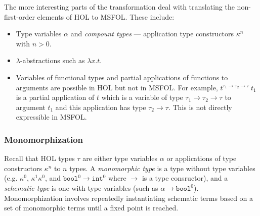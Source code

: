 \documentclass{article}
\begin{document}
	The more interesting parts of the 
	transformation deal with 
	translating the non-first-order
	elements of HOL to MSFOL. These 
	include:
	\begin{itemize}
		\item Type variables $\alpha$
		and \textit{compount types} ---
		application type constructors
		$\kappa^n$ with $n > 0$.
		\item $\lambda$-abstractions 
		such as $\lambda x. t$.
		\item Variables of functional 
		types and partial applications 
		of functions to arguments are 
		possible in HOL but not in 
		MSFOL. For example, 
		$t^{\tau_1 \to \tau_2 \to 
		\tau}\ t_1$ is a 
		partial application of $t$ 
		which is a variable of type 
		$\tau_1 \to \tau_2 \to \tau$
		to argument $t_1$ and this 
		application has type 
		$\tau_2 \to \tau$.
		This is not directly 
		expressible in MSFOL.
	\end{itemize}

	\subsubsection{Monomorphization}
		Recall that HOL types $\tau$ are 
		either type	variables $\alpha$ or 
		applications of type constructors 
		$\kappa^n$ to $n$ types.
		A \textit{monomorphic type} is a
		type without type variables 
		(e.g. $\kappa^0$, $\kappa^1 
		\kappa^0$, and $\texttt{bool}^0 
		\to \texttt{int}^0$ 
		where $\to$ is 
		a type consructor), and 
		a \textit{schematic type} is one 
		with type variables (such as 
		$\alpha \to \texttt{bool}^0$). 
		Monomorphization involves 
		repeatedly instantiating schematic
		terms based on a set of 
		monomorphic terms until a fixed 
		point is reached.
		
\end{document}
